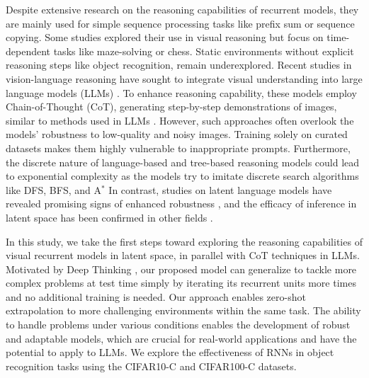 Despite extensive research on the reasoning capabilities of recurrent models, they are mainly used for simple sequence processing tasks like prefix sum or sequence copying. 
Some studies \citep{eyzaguirre2020differentiable,veerabadran2023Adaptive} explored their use in visual reasoning but focus on time-dependent tasks like maze-solving or chess. 
Static environments without explicit reasoning steps like object recognition, remain underexplored.
Recent studies in vision-language reasoning have sought to integrate visual understanding into large language models (LLMs) \citep{lin2024vila,wang2024qwen2}. 
To enhance reasoning capability, these models employ Chain-of-Thought (CoT), generating step-by-step demonstrations of images, similar to methods used in LLMs \citep{dong2024insight,thawakar2025llamav}. 
However, such approaches often overlook the models' robustness to low-quality and noisy images.
Training solely on curated datasets makes them highly vulnerable to inappropriate prompts. 
Furthermore, the discrete nature of language-based and tree-based reasoning models could lead to exponential complexity as the models try to imitate discrete search algorithms like DFS, BFS, and A$^*$ \citep{lehnert2024beyond, yao2023tree}
In contrast, studies on latent language models have revealed promising signs of enhanced robustness \citep{hao2024training}, and the efficacy of inference in latent space has been confirmed in other fields \citep{rombach2022high,radford2021learning,videoworldsimulators2024}.

In this study, we take the first steps toward exploring the reasoning capabilities of visual recurrent models in latent space, in parallel with CoT techniques in LLMs. 
Motivated by Deep Thinking \citep{schwarzschild2021can,bansal2022endtoend}, our proposed model can generalize to tackle more complex problems at test time simply by iterating its recurrent units more times and no additional training is needed. 
Our approach enables zero-shot extrapolation to more challenging environments within the same task.
The ability to handle problems under various conditions enables the development of robust and adaptable models, which are crucial for real-world applications and have the potential to apply to LLMs. 
We explore the effectiveness of RNNs in object recognition tasks using the CIFAR10-C and CIFAR100-C \citep{cifarC} datasets.

